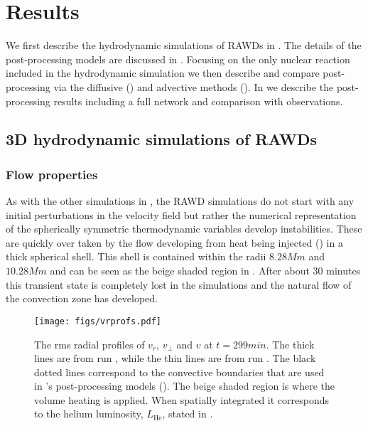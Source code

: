 \documentclass[fleqn,usenatbib]{mnras}
\newcommand{\ppmstar}{\code{PPMstar}}
\begin{document}

\section{Results}
\label{sec:results}

We first describe the hydrodynamic simulations of RAWDs in .
The details of the post-processing models are discussed in .
Focusing on the only nuclear reaction included in the hydrodynamic simulation we
then describe and compare post-processing via the diffusive ()
and advective methods (). In  we
describe the post-processing results including a full network and comparison
with observations. 

\subsection{3D hydrodynamic simulations of RAWDs}
\label{sec:RAWD_Hydro}
\subsubsection{Flow properties}
\label{sec:flow}

As with the other \ppmstar{} simulations in
\citet{woodward15,Jones:2017kc,Andrassy:19}, the RAWD simulations do not
start with any initial perturbations in the velocity field but rather the
numerical representation of the spherically symmetric thermodynamic variables
develop instabilities. These are quickly over taken by the flow developing from
heat being injected () in a thick spherical shell. This shell
is contained within the radii $\unit{8.28}{Mm}$ and $\unit{10.28}{Mm}$ and can
be seen as the beige shaded region in . After about 30 minutes this
transient state is completely lost in the simulations and the natural flow of
the convection zone has developed.

\begin{figure}
  \texttt{[image: figs/vrprofs.pdf]}
  \centering
  \caption{The rms radial profiles of $v_{r}$, $v_{\perp}$ and
          $v$ at $t = \unit{299}{min}$. The thick lines are from run , while
          the thin lines are from run . The black dotted lines correspond to the
          convective boundaries that are used in 's post-processing models
          (). The beige shaded region is where the
          volume heating is applied. When spatially integrated it corresponds to the
          helium luminosity, $L_{\mathrm{He}}$, stated in .}
  \label{fig:rprofs}

\end{figure}
\end{document}

